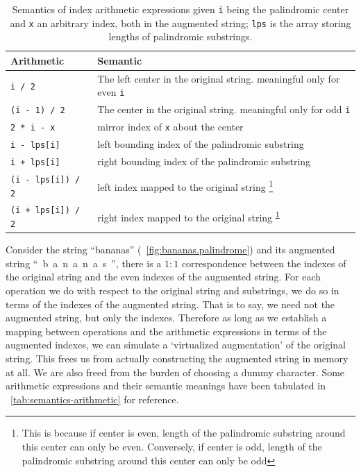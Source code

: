 \documentclass[oneside,11pt]{book}
\theoremstyle{definition}
\theoremstyle{remark}
\newcommand{\code}[1]{\mbox{\lstinline{#1}}}
\begin{document}
\begin{savenotes}
    \begin{table}[htb]
        \centering
        \caption{\label{tab:semantics-arithmetic} Semantics of index arithmetic expressions given
        \code{i} being the palindromic center and \code{x} an arbitrary index, both in the augmented
        string; \code{lps} is the array storing lengths of palindromic substrings.}
\begin{tabular}{l|l}
            \hline
            Arithmetic & Semantic\\
            \hline
            \code{i / 2} & The left center in the original string.
            meaningful only for even \code{i}\\
            \code{(i - 1) / 2} & The center in the original string.
            meaningful only for odd \code{i}\\
            \code{2 * i - x} & mirror index of \code{x} about the center \\
            \code{i - lps[i]} & left bounding index of the palindromic substring\\
            \code{i + lps[i]} & right bounding index of the palindromic substring \\
            \code{(i - lps[i]) / 2} & left index mapped to the original string \footnote{
            \label{odd-odd-even-even} This is because if center is even, length of the
            palindromic substring around this center can only be even.
            Conversely, if center is odd, length of the palindromic substring
            around this center can only be odd} \\
            \code{(i + lps[i]) / 2} & right index mapped to the original string
            \textsuperscript{\ref{odd-odd-even-even}} \\
            \hline
        \end{tabular}
    \end{table}
\end{savenotes}


Consider the string \mbox{``bananas''} (~\autoref{fig:bananas.palindrome}) and its augmented string
\mbox{`` b a n a n a s ''}, there is a $1:1$ correspondence between the
indexes of the original string and the even indexes of the augmented string.
For each operation we do with respect to the original string and substrings, we do so in terms of
the indexes of the augmented string.
That is to say, we need not the augmented string, but only the indexes.
Therefore as long as we establish a mapping between operations and the arithmetic expressions in
terms of the augmented indexes, we can simulate a `virtualized augmentation' of the
original string.
This frees us from actually constructing the augmented string in memory at all.
We are also freed from the burden of choosing a dummy character.
Some arithmetic expressions and their semantic meanings have been tabulated in
~\autoref{tab:semantics-arithmetic} for reference.
\end{document}
